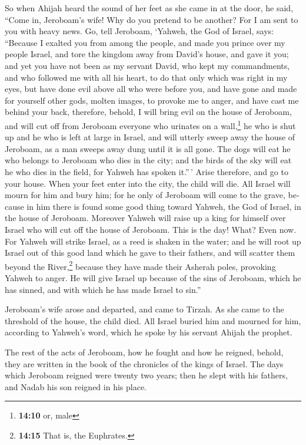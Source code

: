 \begin{paracol}{2}
\begin{otherlanguage}{english}
 So when Ahijah heard the sound of her feet as she came in
at the door, he said, ``Come in, Jeroboam's wife! Why do you pretend to
be another? For I am sent to you with heavy news.  Go,
tell Jeroboam, `Yahweh, the God of Israel, says: ``Because I exalted you
from among the people, and made you prince over my people Israel,
 and tore the kingdom away from David's house, and gave it
you; and yet you have not been as my servant David, who kept my
commandments, and who followed me with all his heart, to do that only
which was right in my eyes,  but have done evil above all
who were before you, and have gone and made for yourself other gods,
molten images, to provoke me to anger, and have cast me behind your
back,  therefore, behold, I will bring evil on the house
of Jeroboam, and will cut off from Jeroboam everyone who urinates on a
wall,\footnote{\textbf{14:10} or, male} he who is shut up and he who is
left at large in Israel, and will utterly sweep away the house of
Jeroboam, as a man sweeps away dung until it is all gone.
 The dogs will eat he who belongs to Jeroboam who dies in
the city; and the birds of the sky will eat he who dies in the field,
for Yahweh has spoken it.''\,'  Arise therefore, and go
to your house. When your feet enter into the city, the child will die.
 All Israel will mourn for him and bury him; for he only
of Jeroboam will come to the grave, because in him there is found some
good thing toward Yahweh, the God of Israel, in the house of Jeroboam.
 Moreover Yahweh will raise up a king for himself over
Israel who will cut off the house of Jeroboam. This is the day! What?
Even now.  For Yahweh will strike Israel, as a reed is
shaken in the water; and he will root up Israel out of this good land
which he gave to their fathers, and will scatter them beyond the
River,\footnote{\textbf{14:15} That is, the Euphrates.} because they
have made their Asherah poles, provoking Yahweh to anger.
 He will give Israel up because of the sins of Jeroboam,
which he has sinned, and with which he has made Israel to sin.''

 Jeroboam's wife arose and departed, and came to Tirzah.
As she came to the threshold of the house, the child died.
 All Israel buried him and mourned for him, according to
Yahweh's word, which he spoke by his servant Ahijah the prophet.

 The rest of the acts of Jeroboam, how he fought and how
he reigned, behold, they are written in the book of the chronicles of
the kings of Israel.  The days which Jeroboam reigned
were twenty two years; then he slept with his fathers, and Nadab his son
reigned in his place.


\end{otherlanguage}
\end{paracol}
